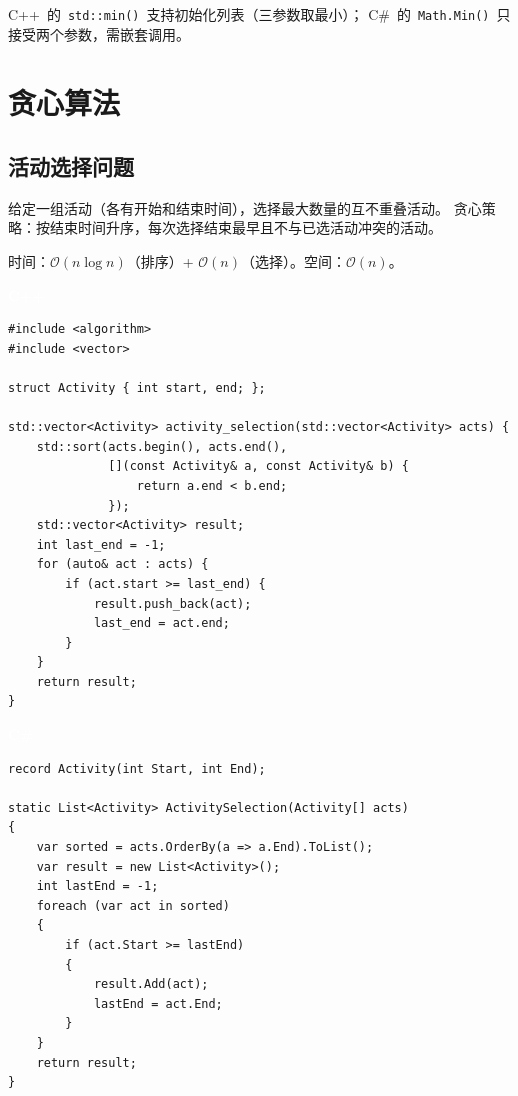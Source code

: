 \documentclass[12pt,a4paper,fontset=fandol]{ctexbook}
\newcommand{\cpplabel}{%
  \noindent\begin{tcolorbox}[sharp corners,colback=cppheadbg,colframe=cppheadbg,
    left=6pt,right=6pt,top=2pt,bottom=2pt,boxrule=0pt]
  \textcolor{white}{\small\bfseries\sffamily C++}\end{tcolorbox}%
}
\newcommand{\csharplabel}{%
  \noindent\begin{tcolorbox}[sharp corners,colback=csharpheadbg,colframe=csharpheadbg,
    left=6pt,right=6pt,top=2pt,bottom=2pt,boxrule=0pt]
  \textcolor{white}{\small\bfseries\sffamily C\#}\end{tcolorbox}%
}
\newcommand{\bigO}[1]{\mathcal{O}(#1)}
\newcommand{\Fn}[1]{\texttt{#1()}}
\begin{document}
\begin{compare}
C++~的~\Fn{std::min}~支持初始化列表（三参数取最小）；
C\#~的~\Fn{Math.Min}~只接受两个参数，需嵌套调用。
\end{compare}

\part{贪心算法}

\chapter{活动选择问题}

给定一组活动（各有开始和结束时间），选择最大数量的互不重叠活动。
贪心策略：按结束时间升序，每次选择结束最早且不与已选活动冲突的活动。

\begin{complexitybox}
  时间：$\bigO{n \log n}$（排序）+ $\bigO{n}$（选择）。空间：$\bigO{n}$。
\end{complexitybox}

\cpplabel
\begin{lstlisting}[style=cppstyle]
#include <algorithm>
#include <vector>

struct Activity { int start, end; };

std::vector<Activity> activity_selection(std::vector<Activity> acts) {
    std::sort(acts.begin(), acts.end(),
              [](const Activity& a, const Activity& b) {
                  return a.end < b.end;
              });
    std::vector<Activity> result;
    int last_end = -1;
    for (auto& act : acts) {
        if (act.start >= last_end) {
            result.push_back(act);
            last_end = act.end;
        }
    }
    return result;
}
\end{lstlisting}

\csharplabel
\begin{lstlisting}[style=csharpstyle]
record Activity(int Start, int End);

static List<Activity> ActivitySelection(Activity[] acts)
{
    var sorted = acts.OrderBy(a => a.End).ToList();
    var result = new List<Activity>();
    int lastEnd = -1;
    foreach (var act in sorted)
    {
        if (act.Start >= lastEnd)
        {
            result.Add(act);
            lastEnd = act.End;
        }
    }
    return result;
}
\end{lstlisting}
\end{document}
